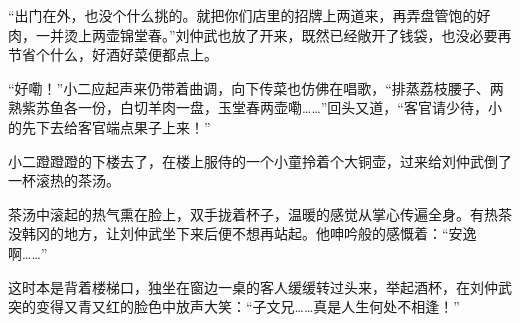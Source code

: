 “出门在外，也没个什么挑的。就把你们店里的招牌上两道来，再弄盘管饱的好肉，一并烫上两壶锦堂春。”刘仲武也放了开来，既然已经敞开了钱袋，也没必要再节省个什么，好酒好菜便都点上。

“好嘞！”小二应起声来仍带着曲调，向下传菜也仿佛在唱歌，“排蒸荔枝腰子、两熟紫苏鱼各一份，白切羊肉一盘，玉堂春两壶嘞……”回头又道，“客官请少待，小的先下去给客官端点果子上来！”

小二蹬蹬蹬的下楼去了，在楼上服侍的一个小童拎着个大铜壶，过来给刘仲武倒了一杯滚热的茶汤。

茶汤中滚起的热气熏在脸上，双手拢着杯子，温暖的感觉从掌心传遍全身。有热茶没韩冈的地方，让刘仲武坐下来后便不想再站起。他呻吟般的感慨着：“安逸啊……”

这时本是背着楼梯口，独坐在窗边一桌的客人缓缓转过头来，举起酒杯，在刘仲武突的变得又青又红的脸色中放声大笑：“子文兄……真是人生何处不相逢！”

